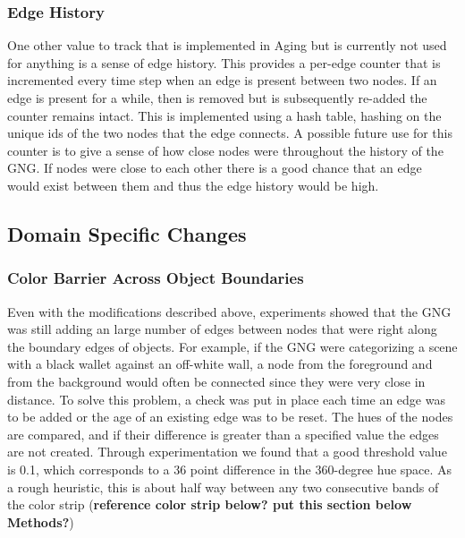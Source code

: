 \documentclass{article}
\renewcommand{\|}{\origbar} %
\begin{document}
\subsubsection{Edge History}

One other value to track that is implemented in Aging but is currently not used for anything is a sense of edge history. This provides a per-edge counter that is incremented every time step when an edge is present between two nodes. If an edge is present for a while, then is removed but is subsequently re-added the counter remains intact. This is implemented using a hash table, hashing on the unique ids of the two nodes that the edge connects. A possible future use for this counter is to give a sense of how close nodes were throughout the history of the GNG. If nodes were close to each other there is a good chance that an edge would exist between them and thus the edge history would be high.

\subsection{Domain Specific Changes}

\subsubsection{Color Barrier Across Object Boundaries}

Even with the modifications described above, experiments showed that the GNG was still adding an large number of edges between nodes that were right along the boundary edges of objects. For example, if the GNG were categorizing a scene with a black wallet against an off-white wall, a node from the foreground and from the background would often be connected since they were very close in distance. To solve this problem, a check was put in place each time an edge was to be added or the age of an existing edge was to be reset. The hues of the nodes are compared, and if their difference is greater than a specified value the edges are not created. Through experimentation we found that a good threshold value is 0.1, which corresponds to a 36 point difference in the 360-degree hue space. As a rough heuristic, this is about half way between any two consecutive bands of the color strip ({\bf reference color strip below? put this section below Methods?})
\end{document}
